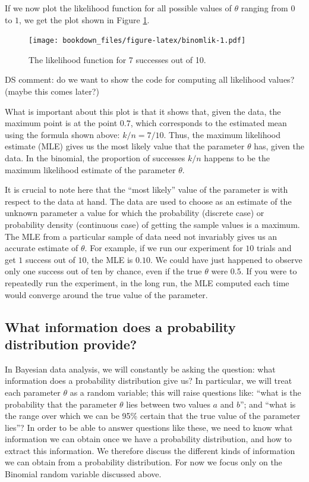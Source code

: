 \documentclass[12pt,]{krantz}
\makeatletter
\newenvironment{kframe}{%
\medskip{}
\setlength{\fboxsep}{.8em}
 \def\at@end@of@kframe{}%
 \ifinner\ifhmode%
  \def\at@end@of@kframe{\end{minipage}}%
  \begin{minipage}{\columnwidth}%
 \fi\fi%
 \def\FrameCommand##1{\hskip\@totalleftmargin \hskip-\fboxsep
 \colorbox{shadecolor}{##1}\hskip-\fboxsep
     \hskip-\linewidth \hskip-\@totalleftmargin \hskip\columnwidth}%
 \MakeFramed {\advance\hsize-\width
   \@totalleftmargin\z@ \linewidth\hsize
   \@setminipage}}%
 {\par\unskip\endMakeFramed%
 \at@end@of@kframe}
\newenvironment{rmdblock}[1]
  {
  \begin{itemize}
  \renewcommand{\labelitemi}{
    \raisebox{-.7\height}[0pt][0pt]{
      {\setkeys{Gin}{width=3em,keepaspectratio}\texttt{[image: images/\#1]}}
    }
  }
  \setlength{\fboxsep}{1em}
  \begin{kframe}
  \item
  }
  {
  \end{kframe}
  \end{itemize}
  }
\newenvironment{rmdnote}
  {\begin{rmdblock}{note}}
  {\end{rmdblock}}
\theoremstyle{definition}
\theoremstyle{definition}
\theoremstyle{definition}
\theoremstyle{remark}
\makeatother
\begin{document}
If we now plot the likelihood function for all possible values of \(\theta\) ranging from \(0\) to \(1\), we get the plot shown in Figure \ref{fig:binomlik}.

\begin{figure}
\centering
\texttt{[image: bookdown\_files/figure-latex/binomlik-1.pdf]}
\caption{\label{fig:binomlik}The likelihood function for 7 successes out of 10.}
\end{figure}

\begin{rmdnote}
DS comment: do we want to show the code for computing all likelihood values? (maybe this comes later?)
\end{rmdnote}

What is important about this plot is that it shows that, given the data, the maximum point is at the point \(0.7\), which corresponds to the estimated mean using the formula shown above: \(k/n = 7/10\). Thus, the maximum likelihood estimate (MLE) gives us the most likely value that the parameter \(\theta\) has, given the data. In the binomial, the proportion of successes \(k/n\) happens to be the maximum likelihood estimate of the parameter \(\theta\).

It is crucial to note here that the ``most likely'' value of the parameter is with respect to the data at hand. The data are used to choose as an estimate of the unknown parameter a value for which the probability (discrete case) or probability density (continuous case) of getting the sample values is a maximum. The MLE from a particular sample of data need not invariably gives us an accurate estimate of \(\theta\). For example, if we run our experiment for \(10\) trials and get \(1\) success out of \(10\), the MLE is \(0.10\). We could have just happened to observe only one success out of ten by chance, even if the true \(\theta\) were \(0.5\). If you were to repeatedly run the experiment, in the long run, the MLE computed each time would converge around the true value of the parameter.

\hypertarget{what-information-does-a-probability-distribution-provide}{%
\subsection{What information does a probability distribution provide?}\label{what-information-does-a-probability-distribution-provide}}

In Bayesian data analysis, we will constantly be asking the question: what information does a probability distribution give us? In particular, we will treat each parameter \(\theta\) as a random variable; this will raise questions like: ``what is the probability that the parameter \(\theta\) lies between two values \(a\) and \(b\)''; and ``what is the range over which we can be 95\% certain that the true value of the parameter lies''? In order to be able to answer questions like these, we need to know what information we can obtain once we have a probability distribution, and how to extract this information. We therefore discuss the different kinds of information we can obtain from a probability distribution. For now we focus only on the Binomial random variable discussed above.
\end{document}
